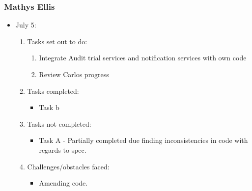 \documentclass[12pt]{article}
\begin{document}
\subsubsection{Mathys Ellis}
	\begin{itemize}
		\item July 5:
		\begin{enumerate}
			\item Tasks set out to do:
			\begin{enumerate}
				\item Integrate Audit trial services and notification services with own code
				\item Review Carlos progress
			\end{enumerate}
			\item Tasks completed:
			\begin{itemize}
				\item Task b
			\end{itemize}
			\item Tasks not completed:
			\begin{itemize}
				\item Task A - Partially completed due finding inconsistencies in code with regards to spec. 
			\end{itemize}
			\item Challenges/obstacles faced:
			\begin{itemize}
				\item Amending code.
			\end{itemize}			
		\end{enumerate}
	\end{itemize}
	
\end{document}
